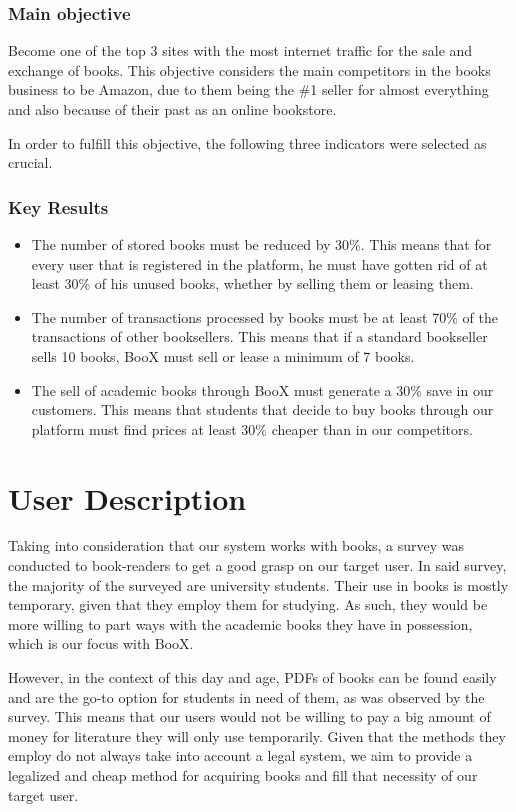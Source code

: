 \documentclass{article}
\begin{document}
\subsubsection{Main objective}
Become one of the top 3 sites with the most internet traffic for the sale and exchange of books. This objective considers the main competitors in the books business to be Amazon, due to them being the \#1 seller for almost everything and also because of their past as an online bookstore.

In order to fulfill this objective, the following three indicators were selected as crucial.
\subsubsection{Key Results} 
\begin{itemize}
    \item The number of stored books must be reduced by 30\%. This means that for every user that is registered in the platform, he must have gotten rid of at least 30\% of his unused books, whether by selling them or leasing them.
    \item The number of transactions processed by books must be at least 70\% of the transactions of other booksellers. This means that if a standard bookseller sells 10 books, BooX must sell or lease a minimum of 7 books.
    \item The sell of academic books through BooX must generate a 30\% save in our customers. This means that students that decide to buy books through our platform must find prices at least 30\% cheaper than in our competitors.
\end{itemize}


\section{User Description}
Taking into consideration that our system works with books, a survey was conducted to book-readers to get a good grasp on our target user. In said survey, the majority of the surveyed are university students. Their use in books is mostly temporary, given that they employ them for studying. As such, they would be more willing to part ways with the academic books they have in possession, which is our focus with BooX. 

However, in the context of this day and age, PDFs of books can be found easily and are the go-to option for students in need of them, as was observed by the survey. This means that our users would not be willing to pay a big amount of money for literature they will only use temporarily. Given that the methods they employ do not always take into account a legal system, we aim to provide a legalized and cheap method for acquiring books and fill that necessity of our target user.
\end{document}
